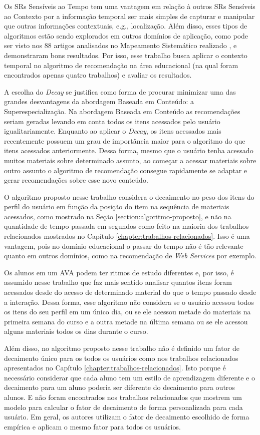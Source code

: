 Os SRs Sensíveis ao Tempo tem uma vantagem em relação à outros SRs Sensíveis ao Contexto por a informação temporal ser
mais simples de capturar e manipular que outras informações contextuais, e.g., localização. Além disso, esses tipos de
algoritmos estão sendo explorados em outros domínios de aplicação, como pode ser visto nos 88 artigos analisados no
Mapeamento Sistemático realizado \cite{de2017time}, e demonstraram bons resultados. Por isso, esse trabalho busca
aplicar o contexto temporal no algoritmo de recomendação na área educacional (na qual foram encontrados apenas quatro
trabalhos) e avaliar os resultados.

A escolha do \textit{Decay} se justifica como forma de procurar minimizar uma das grandes desvantagens da abordagem Baseada em Conteúdo: a
Superespecialização. Na abordagem Baseada em Conteúdo as recomendações seriam geradas levando em conta todos os itens
acessados pelo usuário igualitariamente. Enquanto ao aplicar o \textit{Decay}, os itens acessados mais recentemente possuem um
grau de importância maior para o algoritmo do que itens acessados anteriormente. Dessa forma, mesmo que o usuário
tenha acessado muitos materiais sobre determinado assunto, ao começar a acessar materiais sobre outro assunto o algoritmo de
recomendação consegue rapidamente se adaptar e gerar recomendações sobre esse novo conteúdo.

O algoritmo proposto nesse trabalho considera o decaimento no peso dos itens do perfil do usuário em função da posição
do item na sequência de materiais acessados, como mostrado na Seção \ref{section:algoritmo-proposto}, e não na quantidade de tempo passada em
segundos como feito na maioria dos trabalhos relacionados mostrados no Capítulo \ref{chapter:trabalhos-relacionados}. Isso é uma vantagem, pois no domínio
educacional o passar do tempo não é tão relevante quanto em outros domínios, como na recomendação de \textit{Web Services} por
exemplo.

Os alunos em um AVA podem ter ritmos de estudo diferentes e, por isso, é assumido nesse trabalho que faz
mais sentido analisar quantos itens foram acessados desde do acesso de determinado material do que o tempo passado desde
a interação. Dessa forma, esse algoritmo não considera se o usuário acessou todos os itens do seu perfil em um
único dia, ou se ele acessou metade do materiais na primeira semana do curso e a outra metade na última semana ou se ele
acessou alguns materiais todos os dias durante o curso.

Além disso, no algoritmo proposto nesse trabalho não é definido um fator de decaimento único para os todos os usuários como nos trabalhos
relacionados apresentados no Capítulo \ref{chapter:trabalhos-relacionados}. Isto porque é necessário considerar
que cada aluno tem um estilo de aprendizagem diferente e o decaimento para um aluno poderia ser diferente do decaimento
para outros alunos. E não foram encontrados nos trabalhos relacionados que mostrem um modelo para calcular o fator de decaimento de forma
personalizada para cada usuário. Em geral, os autores utilizam o fator de decaimento escolhido de forma empírica e
aplicam o mesmo fator para todos os usuários.

